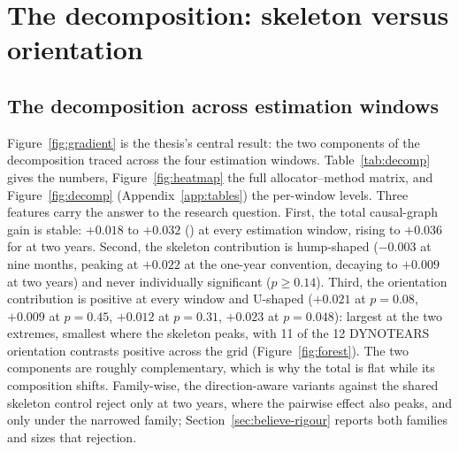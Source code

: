 \section{The decomposition: skeleton versus orientation}
\label{sec:decomposition}

\subsection{The decomposition across estimation windows}

Figure~\ref{fig:gradient} is the thesis's central result:
the two components of the decomposition traced across the four estimation
windows. Table~\ref{tab:decomp} gives the numbers,
Figure~\ref{fig:heatmap} the full
allocator--method matrix, and Figure~\ref{fig:decomp}
(Appendix~\ref{app:tables}) the per-window levels. Three features carry the answer to the research
question. First, the
total causal-graph gain is stable: $+0.018$ to $+0.032$ (\skelsem{}) at
every
estimation window, rising to $+0.036$ for \orientsem{} at two years. Second, the
skeleton contribution is hump-shaped ($-0.003$ at nine months, peaking at
$+0.022$ at the one-year convention, decaying to $+0.009$ at two years) and
never individually significant ($p \geq 0.14$). Third, the
orientation contribution is positive at every window and U-shaped ($+0.021$ at
$p=0.08$, $+0.009$ at $p=0.45$, $+0.012$ at $p=0.31$, $+0.023$ at
$p=0.048$): largest at the two extremes, smallest where the skeleton peaks,
with 11 of the 12 DYNOTEARS orientation contrasts positive across the grid
(Figure~\ref{fig:forest}). The two components are roughly complementary,
which is why the total is flat while its composition shifts. Family-wise,
the direction-aware variants against the shared skeleton control reject
only at two years, where the pairwise effect also peaks, and only under
the narrowed family; Section~\ref{sec:believe-rigour} reports both
families and sizes that rejection.

